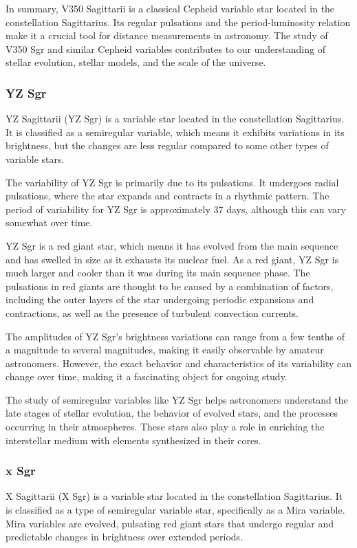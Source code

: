 In summary, V350 Sagittarii is a classical Cepheid variable star located in the constellation Sagittarius. Its regular pulsations and the period-luminosity relation make it a crucial tool for distance measurements in astronomy. The study of V350 Sgr and similar Cepheid variables contributes to our understanding of stellar evolution, stellar models, and the scale of the universe.

\subsubsection*{ YZ Sgr }
YZ Sagittarii (YZ Sgr) is a variable star located in the constellation Sagittarius. It is classified as a semiregular variable, which means it exhibits variations in its brightness, but the changes are less regular compared to some other types of variable stars.

The variability of YZ Sgr is primarily due to its pulsations. It undergoes radial pulsations, where the star expands and contracts in a rhythmic pattern. The period of variability for YZ Sgr is approximately 37 days, although this can vary somewhat over time.

YZ Sgr is a red giant star, which means it has evolved from the main sequence and has swelled in size as it exhausts its nuclear fuel. As a red giant, YZ Sgr is much larger and cooler than it was during its main sequence phase. The pulsations in red giants are thought to be caused by a combination of factors, including the outer layers of the star undergoing periodic expansions and contractions, as well as the presence of turbulent convection currents.

The amplitudes of YZ Sgr's brightness variations can range from a few tenths of a magnitude to several magnitudes, making it easily observable by amateur astronomers. However, the exact behavior and characteristics of its variability can change over time, making it a fascinating object for ongoing study.

The study of semiregular variables like YZ Sgr helps astronomers understand the late stages of stellar evolution, the behavior of evolved stars, and the processes occurring in their atmospheres. These stars also play a role in enriching the interstellar medium with elements synthesized in their cores.
\subsubsection*{ x Sgr }
X Sagittarii (X Sgr) is a variable star located in the constellation Sagittarius. It is classified as a type of semiregular variable star, specifically as a Mira variable. Mira variables are evolved, pulsating red giant stars that undergo regular and predictable changes in brightness over extended periods.

